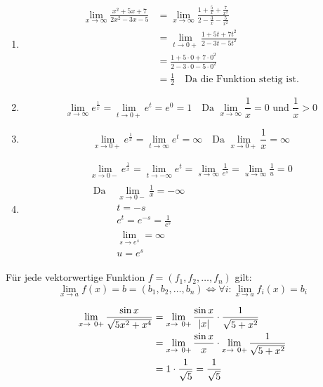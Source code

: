 \begin{bsp*}
	\begin{enumerate}[label=\alph*)]
		\item \[ \begin{split}
			\lim_{x \rightarrow \infty} \frac{x^2 + 5x + 7}{2x^2 - 3x - 5} &= \lim_{x \rightarrow \infty} \frac{ 1 + \frac{5}{x} + \frac{7}{x^2}}{2 - \frac{3}{x} - \frac{5}{x^2}} \\
				&= \lim_{t \rightarrow 0+} \frac{1 + 5t + 7t^2}{2 - 3t - 5t^2} \\
				&= \frac{1 + 5 \cdot 0 + 7 \cdot 0^2}{2 - 3 \cdot 0 - 5 \cdot 0^2} \\
				&= \frac{1}{2} \quad \text{Da die Funktion stetig ist.}
		\end{split} \]
		\item \[ \lim_{x \rightarrow \infty} e^{\frac{1}{x}} = \lim_{t \rightarrow 0+} e^t = e^0 = 1 \quad \text{Da } \lim_{x \rightarrow \infty} \frac{1}{x} = 0 \text{ und } \frac{1}{x} > 0 \]
		\item \[ \lim_{x \rightarrow 0+} e^{\frac{1}{x}} = \lim_{t \rightarrow \infty} e^t = \infty \quad \text{Da } \lim_{x \rightarrow 0+} \frac{1}{x} = \infty \]
		\item \begin{gather*}
			\lim_{x \rightarrow 0-} e^{\frac{1}{x}} = \lim_{t \rightarrow -\infty} e^t = \lim_{s \rightarrow \infty} \frac{1}{e^s} = \lim_{u \rightarrow \infty} \frac{1}{u} = 0 \\
			\begin{split}
				\text{Da }
					&\lim_{x \rightarrow 0-} \frac{1}{x} = -\infty \\
					&t=-s \\
					&e^t = e^{-s} = \frac{1}{e^s} \\
					&\lim_{s \rightarrow e^s} = \infty \\
					&u = e^s
			\end{split}
		\end{gather*}
	\end{enumerate}
\end{bsp*}
\begin{fakt}
	Für jede vektorwertige Funktion $f = (f_1, f_2, \dotsc , f_n)$ gilt:
	\[ \lim_{x \rightarrow a} f(x) = b = (b_1, b_2, \dotsc , b_n) \iff \forall i : \lim_{x \rightarrow a} f_i(x) = b_i \]
\end{fakt}
\begin{bsp*}
	\[ \begin{split}
		\lim_{x \rightarrow 0+} \frac{\sin x}{\sqrt{5x^2 + x^4}}
			&= \lim_{x \rightarrow 0+} \frac{\sin x}{\abs{x}} \cdot \frac{1}{\sqrt{5 + x^2}} \\
			&= \lim_{x \rightarrow 0+} \frac{\sin x}{x} \cdot \lim_{x \rightarrow 0+} \frac{1}{\sqrt{5 + x^2}} \\
			&= 1 \cdot \frac{1}{\sqrt{5}} = \frac{1}{\sqrt{5}}
	\end{split} \]
\end{bsp*}
